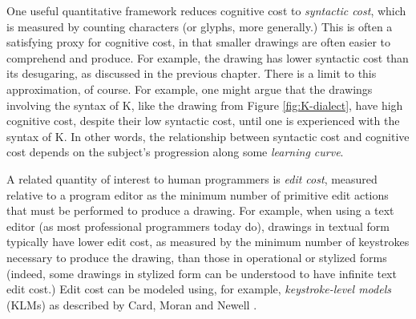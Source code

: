 

One useful quantitative framework reduces cognitive cost to \emph{syntactic cost}, which is measured by counting characters (or glyphs, more generally.) This is often a satisfying proxy for cognitive cost, in that smaller drawings are often easier to comprehend and produce. For example, the drawing \li{[x, y, z]} has lower syntactic cost than its desugaring, as discussed in the previous chapter. There is a limit to this approximation, of course. For example, one might argue that the drawings involving the syntax of K, like the drawing from Figure \ref{fig:K-dialect}, have high cognitive cost, despite their low syntactic cost, until one is experienced with the syntax of K. In other words, the relationship between syntactic cost and cognitive cost depends on the subject's progression along some \emph{learning curve}.

A related quantity of interest to human programmers is \emph{edit cost}, measured relative to a program editor as the minimum number of primitive edit actions that must be performed to produce a drawing. For example, when using a text editor (as most professional programmers today do), drawings in textual form typically have lower edit cost, as measured by the minimum number of keystrokes necessary to produce the drawing, than those in operational or stylized forms (indeed, some drawings in stylized form can be understood to have infinite text edit cost.) Edit cost can be modeled using, for example, \emph{keystroke-level models} (KLMs) as described by Card, Moran and Newell \cite{journals/cacm/CardMN80}.%

